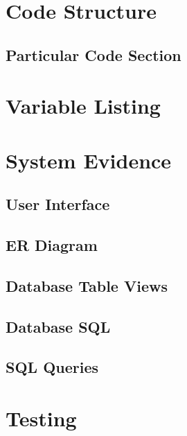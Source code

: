 \section{Code Structure}

\subsection{Particular Code Section}
\begin{comment}
\begin{figure}[H]
    \pythonfile[firstline=5,lastline=10]{./tex/function_programs/print_function.py}
    \caption{The print() function} \label{fig:print_function}
\end{figure}
\end{comment}

\section{Variable Listing}

\section{System Evidence}

\subsection{User Interface}

\subsection{ER Diagram}

\subsection{Database Table Views}

\subsection{Database SQL}

\subsection{SQL Queries}

\section{Testing}

